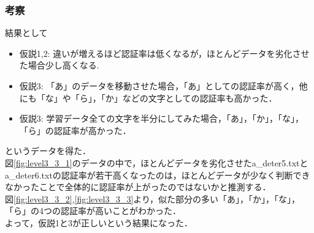 \subsubsection{考察}
結果として
\begin{itemize}
	\item 仮説1,2: 違いが増えるほど認証率は低くなるが，ほとんどデータを劣化させた場合少し高くなる.
	\item 仮説3: 「あ」のデータを移動させた場合，「あ」としての認証率が高く，他にも「な」や「ら」，「か」などの文字としての認証率も高かった．
	\item 仮説3: 学習データ全ての文字を半分にしてみた場合，「あ」，「か」，「な」，「ら」の認証率が高かった．
\end{itemize}
というデータを得た．\\
図\ref{fig:level3_3_1}のデータの中で，ほとんどデータを劣化させたa\_deter5.txtとa\_deter6.txtの認証率が若干高くなったのは，ほとんどデータが少なく判断できなかったことで全体的に認証率が上がったのではないかと推測する．\\
図\ref{fig:level3_3_2},\ref{fig:level3_3_3}より，似た部分の多い「あ」，「か」，「な」，「ら」の4つの認証率が高いことがわかった．\\
よって，仮説1と3が正しいという結果になった．
